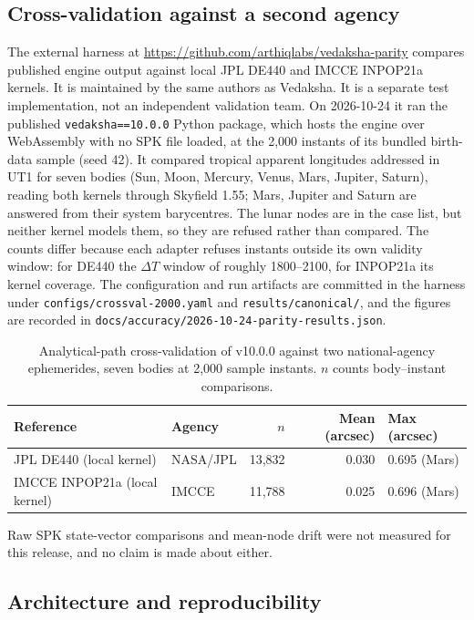 \documentclass[11pt]{article}
\begin{document}
\subsection{Cross-validation against a second agency}

The external harness at \url{https://github.com/arthiqlabs/vedaksha-parity}
compares published engine output against local JPL DE440 and IMCCE INPOP21a kernels.
It is maintained by the same authors as Vedaksha. It is a separate test implementation,
not an independent validation team.
On 2026-10-24 it ran the published \texttt{vedaksha==10.0.0} Python package, which hosts
the engine over WebAssembly with no SPK file loaded, at the 2,000 instants of its bundled
birth-data sample (seed 42). It compared tropical apparent longitudes addressed in UT1 for
seven bodies (Sun, Moon, Mercury, Venus, Mars, Jupiter, Saturn), reading both kernels
through Skyfield 1.55; Mars, Jupiter and Saturn are answered from their system barycentres.
The lunar nodes are in the case list, but neither kernel models them, so they are refused
rather than compared. The counts differ because each adapter refuses instants outside its
own validity window: for DE440 the $\Delta T$ window of roughly 1800--2100, for INPOP21a its
kernel coverage. The configuration and run artifacts are committed in the harness under
\texttt{configs/crossval-2000.yaml} and \texttt{results/canonical/}, and the figures are
recorded in \texttt{docs/accuracy/2026-10-24-parity-results.json}.

\begin{table}[!htbp]
\centering
\small
\begin{tabular}{@{}llrrl@{}}
\toprule
Reference & Agency & $n$ & Mean (arcsec) & Max (arcsec) \\
\midrule
JPL DE440 (local kernel) & NASA/JPL & 13,832 & 0.030 & 0.695 (Mars) \\
IMCCE INPOP21a (local kernel) & IMCCE & 11,788 & 0.025 & 0.696 (Mars) \\
\bottomrule
\end{tabular}
\caption{Analytical-path cross-validation of v10.0.0 against two national-agency
ephemerides, seven bodies at 2,000 sample instants. $n$ counts body--instant comparisons.}
\label{tab:crossval}
\end{table}

Raw SPK state-vector comparisons and mean-node drift were not measured for this
release, and no claim is made about either.

\subsection{Architecture and reproducibility}
\end{document}
